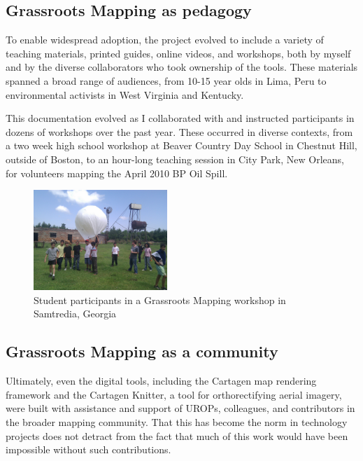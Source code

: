 \documentclass[11pt,oneside,notitlepage]{report}
\begin{document}
\subsection{Grassroots Mapping as pedagogy}

To enable widespread adoption, the project evolved to include a variety of teaching materials, printed guides, online videos, and workshops, both by myself and by the diverse collaborators who took ownership of the tools. These materials spanned a broad range of audiences, from 10-15 year olds in Lima, Peru to environmental activists in West Virginia and Kentucky. 

This documentation evolved as I collaborated with and instructed participants in dozens of workshops over the past year. These occurred in diverse contexts, from a two week high school workshop at Beaver Country Day School in Chestnut Hill, outside of Boston, to an hour-long teaching session in City Park, New Orleans, for volunteers mapping the April 2010 BP Oil Spill. 

\begin{figure}
	\begin{flushright}
		\includegraphics[width=0.45\textwidth]{images/samtredia.jpg}
	\caption{Student participants in a Grassroots Mapping workshop in Samtredia, Georgia}
	\end{flushright}
\end{figure}

\subsection{Grassroots Mapping as a community}

Ultimately, even the digital tools, including the Cartagen map rendering framework and the Cartagen Knitter, a tool for orthorectifying aerial imagery, were built with assistance and support of UROPs, colleagues, and contributors in the broader mapping community. That this has become the norm in technology projects does not detract from the fact that much of this work would have been impossible without such contributions. 
\end{document}
